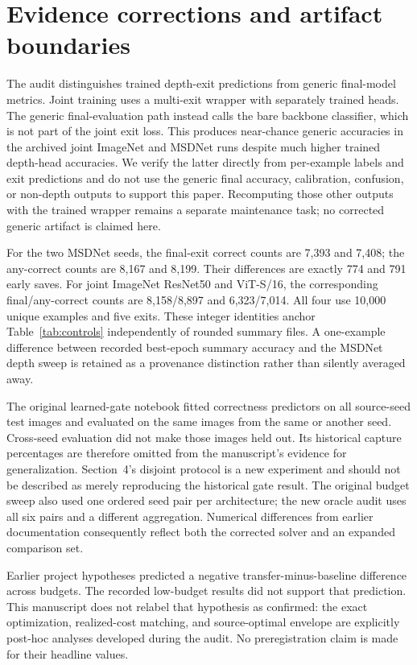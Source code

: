 \documentclass[11pt,a4paper]{article}
\begin{document}
\section{Evidence corrections and artifact boundaries}\label{app:provenance}
The audit distinguishes trained depth-exit predictions from generic final-model metrics. Joint training uses a multi-exit wrapper with separately trained heads. The generic final-evaluation path instead calls the bare backbone classifier, which is not part of the joint exit loss. This produces near-chance generic accuracies in the archived joint ImageNet and MSDNet runs despite much higher trained depth-head accuracies. We verify the latter directly from per-example labels and exit predictions and do not use the generic final accuracy, calibration, confusion, or non-depth outputs to support this paper. Recomputing those other outputs with the trained wrapper remains a separate maintenance task; no corrected generic artifact is claimed here.

For the two MSDNet seeds, the final-exit correct counts are 7,393 and 7,408; the any-correct counts are 8,167 and 8,199. Their differences are exactly 774 and 791 early saves. For joint ImageNet ResNet50 and ViT-S/16, the corresponding final/any-correct counts are 8,158/8,897 and 6,323/7,014. All four use 10,000 unique examples and five exits. These integer identities anchor Table~\ref{tab:controls} independently of rounded summary files. A one-example difference between recorded best-epoch summary accuracy and the MSDNet depth sweep is retained as a provenance distinction rather than silently averaged away.

The original learned-gate notebook fitted correctness predictors on all source-seed test images and evaluated on the same images from the same or another seed. Cross-seed evaluation did not make those images held out. Its historical capture percentages are therefore omitted from the manuscript's evidence for generalization. Section~4's disjoint protocol is a new experiment and should not be described as merely reproducing the historical gate result. The original budget sweep also used one ordered seed pair per architecture; the new oracle audit uses all six pairs and a different aggregation. Numerical differences from earlier documentation consequently reflect both the corrected solver and an expanded comparison set.

Earlier project hypotheses predicted a negative transfer-minus-baseline difference across budgets. The recorded low-budget results did not support that prediction. This manuscript does not relabel that hypothesis as confirmed: the exact optimization, realized-cost matching, and source-optimal envelope are explicitly post-hoc analyses developed during the audit. No preregistration claim is made for their headline values.

\clearpage
\begingroup\small\raggedright


\endgroup
\end{document}
